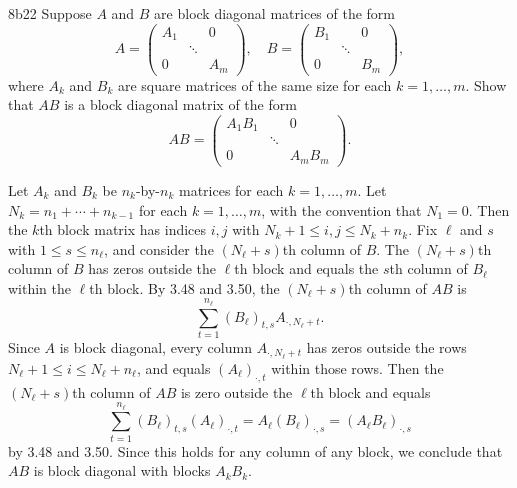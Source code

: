 \begin{exercise}{8b22}
    Suppose $A$ and $B$ are block diagonal matrices of the form
    \[
        A = \begin{pmatrix}
            A_1 & & 0 \\
            & \ddots & \\
            0 & & A_m
        \end{pmatrix}, \quad
        B = \begin{pmatrix}
            B_1 & & 0 \\
            & \ddots & \\
            0 & & B_m
        \end{pmatrix},
    \]
    where $A_k$ and $B_k$ are square matrices of the same size for each $k = 1, \ldots, m$.
    Show that $AB$ is a block diagonal matrix of the form
    \[
        AB = \begin{pmatrix}
            A_1 B_1 & & 0 \\
            & \ddots & \\
            0 & & A_m B_m
        \end{pmatrix}.
    \]
\end{exercise}

\begin{sol}
    Let $A_k$ and $B_k$ be $n_k$-by-$n_k$ matrices for each $k = 1, \ldots, m$.
    Let $N_k = n_1 + \cdots + n_{k-1}$ for each $k = 1, \ldots, m$, with the convention that $N_1 = 0$.
    Then the $k$th block matrix has indices $i, j$ with $N_k + 1 \leq i, j \leq N_k + n_k$.
    Fix $\ell$ and $s$ with $1 \leq s \leq n_\ell$, and consider the $(N_\ell + s)$th column of $B$.
    The $(N_\ell + s)$th column of $B$ has zeros outside the $\ell$th block and equals the $s$th column of $B_\ell$ within the $\ell$th block.
    By 3.48 and 3.50, the $(N_\ell + s)$th column of $AB$ is
    \[
        \sum_{t=1}^{n_\ell} (B_\ell)_{t, s} A_{\cdot, N_\ell + t}.
    \]
    Since $A$ is block diagonal, every column $A_{\cdot, N_\ell + t}$ has zeros outside the rows $N_\ell + 1 \leq i \leq N_\ell + n_\ell$, and equals $(A_\ell)_{\cdot, t}$ within those rows.
    Then the $(N_\ell + s)$th column of $AB$ is zero outside the $\ell$th block and equals
    \[
        \sum_{t=1}^{n_\ell} (B_\ell)_{t, s} (A_\ell)_{\cdot, t} = A_\ell (B_\ell)_{\cdot, s} = (A_\ell B_\ell)_{\cdot, s}
    \]
    by 3.48 and 3.50.
    Since this holds for any column of any block, we conclude that $AB$ is block diagonal with blocks $A_k B_k$.
\end{sol}

